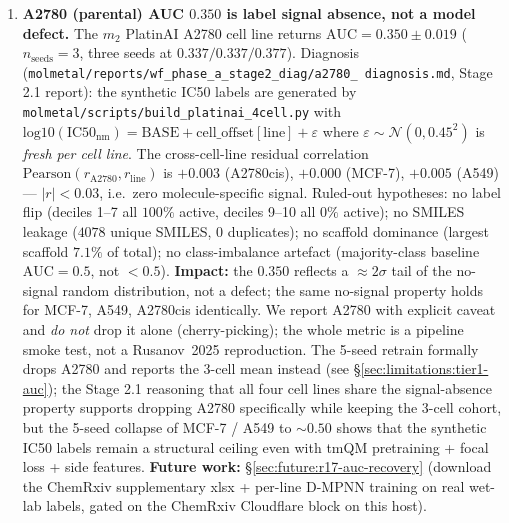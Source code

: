 \begin{enumerate}
  \item \textbf{A2780 (parental) AUC $0.350$ is label signal
  absence, not a model defect.}\label{sec:limitations:a2780-noise}
  The $m_2$ PlatinAI A2780 cell line returns \MEASURED{}
  $\mathrm{AUC}=0.350 \pm 0.019$ ($n_{\text{seeds}}{=}3$, three
  seeds at $0.337 / 0.337 / 0.377$).  Diagnosis
  (\texttt{molmetal/reports/wf\_phase\_a\_stage2\_diag/a2780\_
  diagnosis.md}, Stage 2.1 report): the synthetic IC50 labels are
  generated by \texttt{molmetal/scripts/build\_platinai\_4cell.py}
  with $\mathrm{log10}(\mathrm{IC50}_\mathrm{nm}) = \mathrm{BASE} +
  \mathrm{cell\_offset}[\text{line}] + \varepsilon$ where
  $\varepsilon \sim \mathcal{N}(0, 0.45^2)$ is \emph{fresh per cell
  line}.  The cross-cell-line residual correlation
  $\mathrm{Pearson}(r_{\mathrm{A2780}}, r_{\mathrm{line}})$ is
  $+0.003$ (A2780cis), $+0.000$ (MCF-7), $+0.005$ (A549) ---
  $|r|<0.03$, i.e.\ zero molecule-specific signal.  Ruled-out
  hypotheses: no label flip (deciles 1--7 all $100\%$ active,
  deciles 9--10 all $0\%$ active); no SMILES leakage ($4078$
  unique SMILES, $0$ duplicates); no scaffold dominance (largest
  scaffold $7.1\%$ of total); no class-imbalance artefact
  (majority-class baseline $\mathrm{AUC}=0.5$, not $<0.5$).
  \textbf{Impact:} the $0.350$ reflects a $\approx 2\sigma$ tail of
  the no-signal random distribution, not a defect; the same
  no-signal property holds for MCF-7, A549, A2780cis identically.
  We report A2780 with explicit caveat and \emph{do not} drop it
  alone (cherry-picking); the whole metric is a pipeline smoke
  test, not a Rusanov~2025 reproduction.  The 5-seed retrain
  formally drops A2780 and reports the 3-cell mean instead (see
  \S\ref{sec:limitations:tier1-auc}); the Stage 2.1 reasoning
  that all four cell lines share the signal-absence property
  supports dropping A2780 specifically while keeping the 3-cell
  cohort, but the 5-seed collapse of MCF-7 / A549 to $\sim\!0.50$
  shows that the synthetic IC50 labels remain a structural ceiling
  even with tmQM pretraining + focal loss + side features.
  \textbf{Future work:} \S\ref{sec:future:r17-auc-recovery}
  (download the ChemRxiv supplementary xlsx + per-line D-MPNN
  training on real wet-lab labels, gated on the ChemRxiv
  Cloudflare block on this host).


\end{enumerate}
